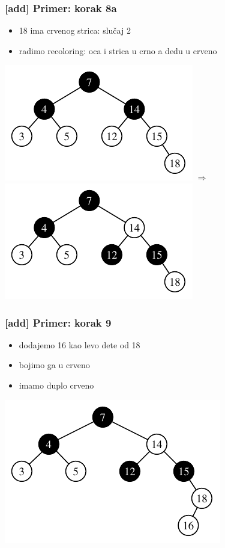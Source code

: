 \documentclass[compress]{beamer}
\begin{document}
\begin{frame}[fragile]
  \frametitle{[add] Primer: korak 8a}
  \begin{itemize}
    \item 18 ima crvenog strica: slučaj 2
    \item radimo recoloring: oca i strica u crno a dedu u crveno
  \end{itemize}
  \begin{center}
    \includegraphics[scale=0.8]{asp-11-add-11.pdf} $\Rightarrow$
    \includegraphics[scale=0.8]{asp-11-add-12.pdf}
  \end{center}
\end{frame}

\begin{frame}[fragile]
  \frametitle{[add] Primer: korak 9}
  \begin{itemize}
    \item dodajemo 16 kao levo dete od 18
    \item bojimo ga u crveno
    \item imamo duplo crveno
  \end{itemize}
  \begin{center}
    \includegraphics[scale=0.8]{asp-11-add-13.pdf}
  \end{center}
\end{frame}
\end{document}
